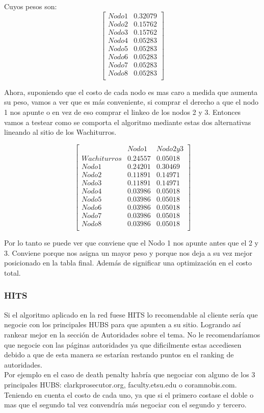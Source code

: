 Cuyos pesos son:
   $$ 
\begin{bmatrix}
Nodo 1 & 0.32079\\
Nodo 2 & 0.15762\\
Nodo 3 & 0.15762\\
Nodo 4 & 0.05283\\
Nodo 5 & 0.05283\\
Nodo 6 & 0.05283\\
Nodo 7 & 0.05283\\
Nodo 8 & 0.05283\\
\end{bmatrix} 
$$

Ahora, suponiendo que el costo de cada nodo es mas caro a medida que aumenta su peso, vamos a ver que es más conveniente, si comprar el derecho a que el nodo 1 nos apunte o en vez de eso comprar el linkeo de los nodos 2 y 3. Entonces vamos a testear como se comporta el algoritmo mediante estas dos alternativas lineando al sitio de los Wachiturros.


   $$ 
\begin{bmatrix}
 & Nodo 1 & Nodo 2 y 3 \\
Wachiturros & 0.24557  & 0.05018   \\
Nodo 1 & 0.24201& 0.30469\\
Nodo 2 & 0.11891& 0.14971\\
Nodo 3 & 0.11891& 0.14971\\
Nodo 4 & 0.03986  & 0.05018\\
Nodo 5 & 0.03986  & 0.05018\\
Nodo 6 & 0.03986  & 0.05018\\
Nodo 7 & 0.03986 & 0.05018\\
Nodo 8 & 0.03986 & 0.05018\\
\end{bmatrix} 
$$

Por lo tanto se puede ver que conviene que el Nodo 1 nos apunte antes que el 2 y 3. Conviene porque nos asigna un mayor peso y porque nos deja a su vez mejor posicionado en la tabla final. Además de significar una optimización en el costo total.

\subsubsection{HITS}
Si el algoritmo aplicado en la red fuese HITS lo recomendable al cliente sería que negocie con los principales HUBS para que apunten a su sitio. Logrando así rankear mejor en la sección de Autoridades sobre el tema. 
No le recomendaríamos que negocie con las páginas autoridades ya que dificilmente estas accediesen debido a que de esta manera se estarían restando puntos en el ranking de autoridades.\\
Por ejemplo en el caso de death penalty habría que negociar con alguno de los 3 principales HUBS: clarkprosecutor.org, faculty.etsu.edu o coramnobis.com. Teniendo en cuenta el costo de cada uno, ya que si el primero costase el doble 
o mas que el segundo tal vez convendría más negociar con el segundo y tercero.
